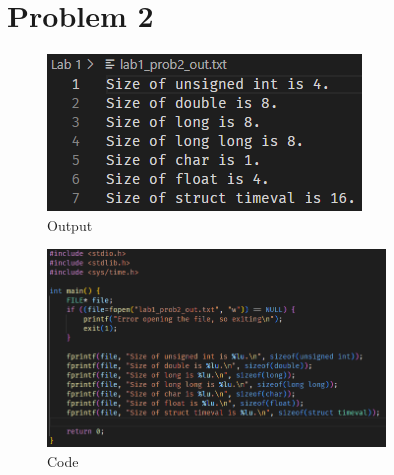 \section*{Problem 2}
\begin{figure}[h!]
    \centering
    \includegraphics{Images/2a Output.png}
    \caption{Output}
\end{figure}

\begin{figure}[h!]
    \centering
    \includegraphics[width=0.8\textwidth]{Images/2a Code.png}
    \caption{Code}
\end{figure}